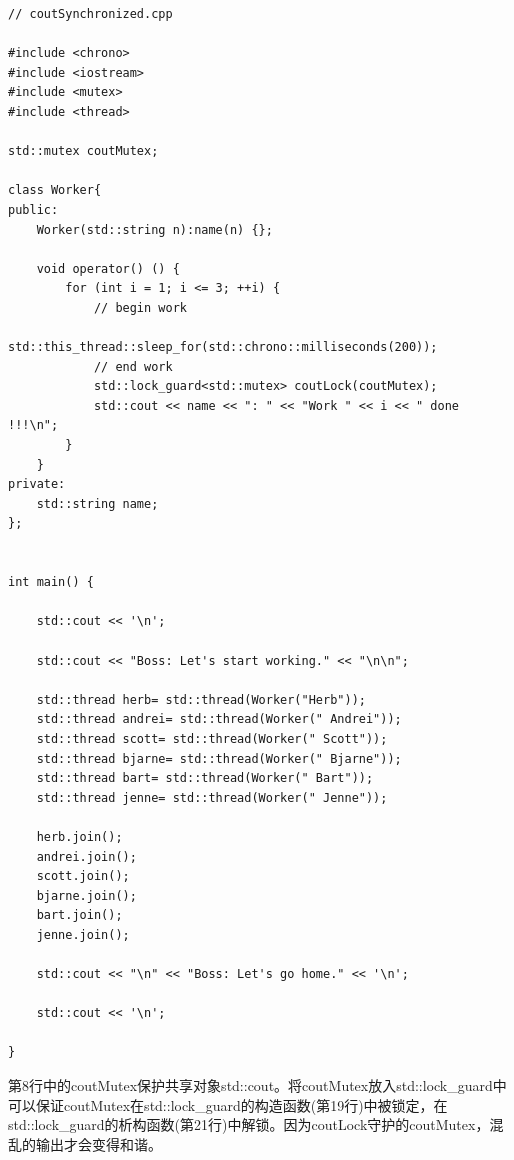 \begin{lstlisting}[style=styleCXX]
// coutSynchronized.cpp

#include <chrono>
#include <iostream>
#include <mutex>
#include <thread>

std::mutex coutMutex;

class Worker{
public:
	Worker(std::string n):name(n) {};
	
	void operator() () {
		for (int i = 1; i <= 3; ++i) {
			// begin work
			std::this_thread::sleep_for(std::chrono::milliseconds(200));
			// end work
			std::lock_guard<std::mutex> coutLock(coutMutex);
			std::cout << name << ": " << "Work " << i << " done !!!\n";
		}
	}
private:
	std::string name;
};


int main() {

	std::cout << '\n';
	
	std::cout << "Boss: Let's start working." << "\n\n";
	
	std::thread herb= std::thread(Worker("Herb"));
	std::thread andrei= std::thread(Worker(" Andrei"));
	std::thread scott= std::thread(Worker(" Scott"));
	std::thread bjarne= std::thread(Worker(" Bjarne"));
	std::thread bart= std::thread(Worker(" Bart"));
	std::thread jenne= std::thread(Worker(" Jenne"));
	
	herb.join();
	andrei.join();
	scott.join();
	bjarne.join();
	bart.join();
	jenne.join();
	
	std::cout << "\n" << "Boss: Let's go home." << '\n';
	
	std::cout << '\n';

}
\end{lstlisting}

第8行中的coutMutex保护共享对象std::cout。将coutMutex放入std::lock\_guard中可以保证coutMutex在std::lock\_guard的构造函数(第19行)中被锁定，在std::lock\_guard的析构函数(第21行)中解锁。因为coutLock守护的coutMutex，混乱的输出才会变得和谐。

